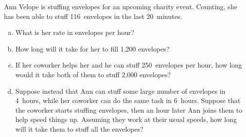 \documentclass[11pt,letterpaper]{article}
\begin{document}
 Ann Velope is stuffing envelopes for an upcoming charity event. Counting, she has been able to stuff 116~envelopes in the last 20~minutes. 
	\begin{enumerate}[(a)]
	\item What is her rate in envelopes per hour?
	\item How long will it take for her to fill 1,200 envelopes? 
	\item If her coworker helps her and he can stuff 250~envelopes per hour, how long would it take both of them to stuff 2,000 envelopes? 
	\item Suppose instead that Ann can stuff some large number of envelopes in 4~hours, while her coworker can do the same task in 6~hours. Suppose that the coworker starts stuffing envelopes, then an hour later Ann joins them to help speed things up. Assuming they work at their usual speeds, how long will it take them to stuff all the envelopes?
	\end{enumerate} \pspace
\end{document}
